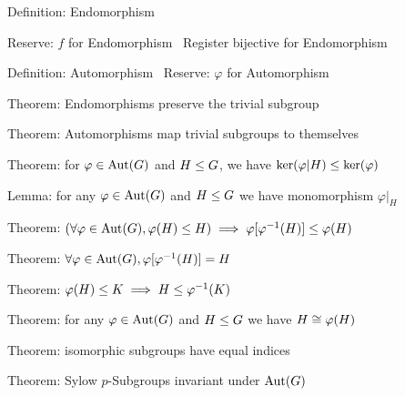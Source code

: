 \nwenddocs{}\endmoddef\nwstartdeflinemarkup{}\nwenddeflinemarkup
\LA{}Definition: \code{}Endomorphism\edoc{}~{\nwtagstyle{}}\RA{}

\LA{}Reserve: $f$ for \code{}Endomorphism\edoc{}~{\nwtagstyle{}}\RA{}
\LA{}Register \code{}bijective\edoc{} for \code{}Endomorphism\edoc{}~{\nwtagstyle{}}\RA{}

\LA{}Definition: \code{}Automorphism\edoc{}~{\nwtagstyle{}}\RA{}
\LA{}Reserve: $\varphi$ for \code{}Automorphism\edoc{}~{\nwtagstyle{}}\RA{}

\LA{}Theorem: Endomorphisms preserve the trivial subgroup~{\nwtagstyle{}}\RA{}

\LA{}Theorem: Automorphisms map trivial subgroups to themselves~{\nwtagstyle{}}\RA{}

\LA{}Theorem: for $\varphi\in\operatorname{Aut}(G)$ and $H\leq G$, we have $\ker(\varphi|H)\leq\ker(\varphi)$~{\nwtagstyle{}}\RA{}

\LA{}Lemma: for any $\varphi\in\operatorname{Aut}(G)$ and $H\leq G$ we have monomorphism $\varphi|_{H}$~{\nwtagstyle{}}\RA{}

\LA{}Theorem: $(\forall\varphi\in\operatorname{Aut}(G),\varphi(H)\leq H)\implies\varphi[\varphi^{-1}(H)]\leq \varphi(H)$~{\nwtagstyle{}}\RA{}

\LA{}Theorem: $\forall\varphi\in\operatorname{Aut}(G), \varphi[\varphi^{-1}(H)]=H$~{\nwtagstyle{}}\RA{}

\LA{}Theorem: $\varphi(H)\leq K\implies H\leq\varphi^{-1}(K)$~{\nwtagstyle{}}\RA{}

\LA{}Theorem: for any $\varphi\in\operatorname{Aut}(G)$ and $H\leq G$ we have $H\cong\varphi(H)$~{\nwtagstyle{}}\RA{}

\LA{}Theorem: isomorphic subgroups have equal indices~{\nwtagstyle{}}\RA{}

\LA{}Theorem: Sylow $p$-Subgroups invariant under $\operatorname{Aut}(G)$~{\nwtagstyle{}}\RA{}

